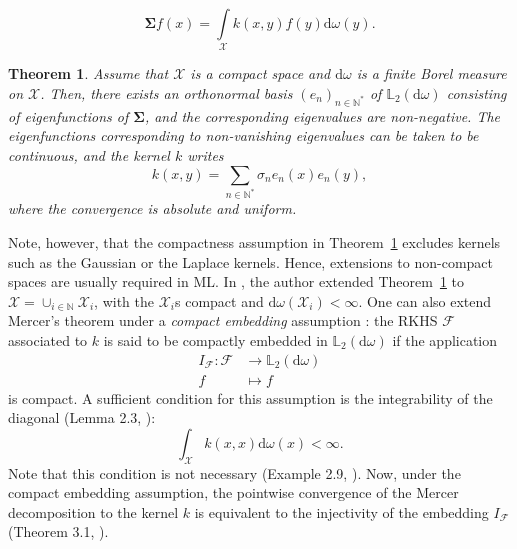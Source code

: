 \documentclass[twoside,11pt]{book}
\newtheorem{theorem}{Theorem}
\begin{document}
\begin{equation}
\bm{\Sigma} f(x) = \int\limits_{\mathcal{X}} k(x,y)f(y) \mathrm{d}\omega(y).
\end{equation}
\begin{theorem}\label{thm:Mercer_for_compact}
Assume that $\mathcal{X}$ is a compact space and $\mathrm{d}\omega$ is a finite Borel measure on $\mathcal{X}$.
Then, there exists an orthonormal basis $(e_{n})_{n \in \mathbb{N}^{*}}$ of $\mathbb{L}_{2}(\mathrm{d}\omega)$ consisting of eigenfunctions of $\bm{\Sigma}$, and the corresponding eigenvalues are non-negative.
The eigenfunctions corresponding to non-vanishing eigenvalues can be taken to be continuous, and the kernel $k$ writes
\begin{equation}
k(x,y) = \sum\limits_{n \in \mathbb{N}^{*}} \sigma_{n} e_{n}(x)e_{n}(y),
\end{equation}
where the convergence is absolute and uniform.
\end{theorem}
   Note, however, that the compactness assumption in Theorem~\ref{thm:Mercer_for_compact} excludes kernels such as the Gaussian or the Laplace kernels.
Hence, extensions to non-compact spaces are usually required in ML.
In \cite{Sun05}, the author extended Theorem~\ref{thm:Mercer_for_compact} to $\mathcal{X} = \cup_{i \in \mathbb{N}} \mathcal{X}_{i}$, with the $\mathcal{X}_{i}$s compact and $\mathrm{d}\omega(\mathcal{X}_{i})<\infty$. One can also extend Mercer's theorem under a \textit{compact embedding} assumption \citep{StSc12}: the RKHS $\mathcal{F}$ associated to $k$ is said to be compactly embedded in $\mathbb{L}_{2}(\mathrm{d}\omega)$ if the application
\begin{align*}
  I_{\mathcal{F}}: \mathcal{F}&\longrightarrow \mathbb{L}_{2}(\mathrm{d}\omega) \\
  f &\longmapsto f
\end{align*}
is compact.
A sufficient condition for this assumption is the integrability of the diagonal (Lemma 2.3, \citep{StSc12}):
\begin{equation}
\int_{\mathcal{X}} k(x,x) \mathrm{d}\omega(x) < \infty.
\end{equation}
Note that this condition is not necessary (Example 2.9, \citep{StSc12}). Now, under the compact embedding assumption, the pointwise convergence of the Mercer decomposition to the kernel $k$ is equivalent to the injectivity of the embedding $I_{\mathcal{F}}$ (Theorem 3.1, \citep{StSc12}).
\end{document}

